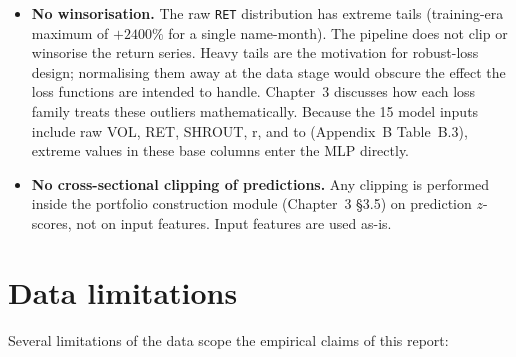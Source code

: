 \begin{itemize}
 \item \textbf{No winsorisation.} The raw \texttt{RET} distribution has extreme tails (training-era maximum of $+2400\%$ for a single name-month). The pipeline does not clip or winsorise the return series. Heavy tails are the motivation for robust-loss design; normalising them away at the data stage would obscure the effect the loss functions are intended to handle. Chapter~3 discusses how each loss family treats these outliers mathematically. Because the 15 model inputs include raw VOL, RET, SHROUT, r, and to (Appendix~B Table~B.3), extreme values in these base columns enter the MLP directly.
 \item \textbf{No cross-sectional clipping of predictions.} Any clipping is performed inside the portfolio construction module (Chapter~3 \S3.5) on prediction $z$-scores, not on input features. Input features are used as-is.
\end{itemize}

\section{Data limitations}\label{sec:data-limitations}

Several limitations of the data scope the empirical claims of this report:

